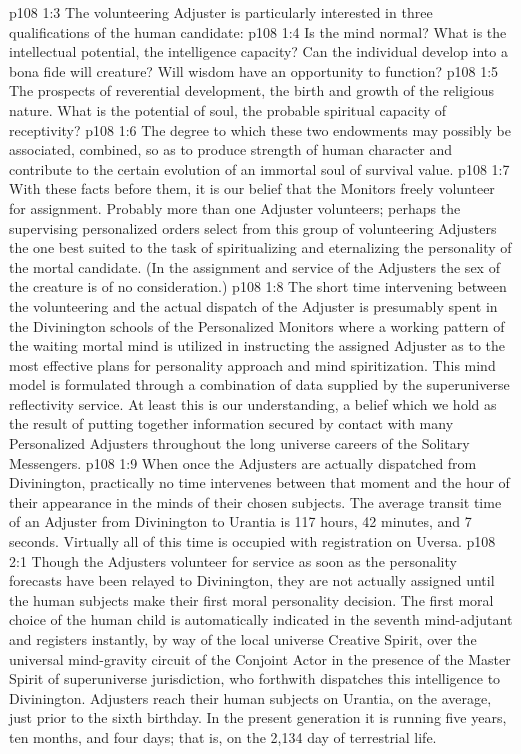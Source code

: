 \vs p108 1:3 The volunteering Adjuster is particularly interested in three qualifications of the human candidate:
\vs p108 1:4 \bibnobreakspace {} Is the mind normal? What is the intellectual potential, the intelligence capacity? Can the individual develop into a bona fide will creature? Will wisdom have an opportunity to function?
\vs p108 1:5 \pc {}\bibnobreakspace {} The prospects of reverential development, the birth and growth of the religious nature. What is the potential of soul, the probable spiritual capacity of receptivity?
\vs p108 1:6 \pc {}\bibnobreakspace {} The degree to which these two endowments may possibly be associated, combined, so as to produce strength of human character and contribute to the certain evolution of an immortal soul of survival value.
\vs p108 1:7 \pc With these facts before them, it is our belief that the Monitors freely volunteer for assignment. Probably more than one Adjuster volunteers; perhaps the supervising personalized orders select from this group of volunteering Adjusters the one best suited to the task of spiritualizing and eternalizing the personality of the mortal candidate. (In the assignment and service of the Adjusters the sex of the creature is of no consideration.)
\vs p108 1:8 The short time intervening between the volunteering and the actual dispatch of the Adjuster is presumably spent in the Divinington schools of the Personalized Monitors where a working pattern of the waiting mortal mind is utilized in instructing the assigned Adjuster as to the most effective plans for personality approach and mind spiritization. This mind model is formulated through a combination of data supplied by the superuniverse reflectivity service. At least this is our understanding, a belief which we hold as the result of putting together information secured by contact with many Personalized Adjusters throughout the long universe careers of the Solitary Messengers.
\vs p108 1:9 When once the Adjusters are actually dispatched from Divinington, practically no time intervenes between that moment and the hour of their appearance in the minds of their chosen subjects. The average transit time of an Adjuster from Divinington to Urantia is 117 hours, 42 minutes, and 7 seconds. Virtually all of this time is occupied with registration on Uversa.
\vs p108 2:1 Though the Adjusters volunteer for service as soon as the personality forecasts have been relayed to Divinington, they are not actually assigned until the human subjects make their first moral personality decision. The first moral choice of the human child is automatically indicated in the seventh mind\hyp{}adjutant and registers instantly, by way of the local universe Creative Spirit, over the universal mind\hyp{}gravity circuit of the Conjoint Actor in the presence of the Master Spirit of superuniverse jurisdiction, who forthwith dispatches this intelligence to Divinington. Adjusters reach their human subjects on Urantia, on the average, just prior to the sixth birthday. In the present generation it is running five years, ten months, and four days; that is, on the 2,134 day of terrestrial life.
